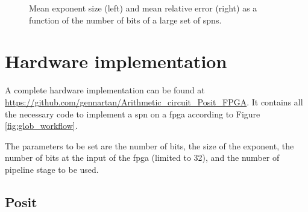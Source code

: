 \begin{figure}[!ht]
\begin{mdframed}
\centering
{}
\caption{Mean exponent size (left) and mean relative error (right) as a function of the number of bits of a large set of \glspl{spn}.}
\label{fig:res_mean}
\end{mdframed}
\end{figure}

\section{Hardware implementation}

A complete hardware implementation can be found at \url{https://github.com/gennartan/Arithmetic_circuit_Posit_FPGA}. It contains all the necessary code to implement a \gls{spn} on a \gls{fpga} according to Figure \ref{fig:glob_workflow}.

The parameters to be set are the number of bits, the size of the exponent, the number of bits at the input of the \gls{fpga} (limited to 32), and the number of pipeline stage to be used.


\subsection{Posit}

